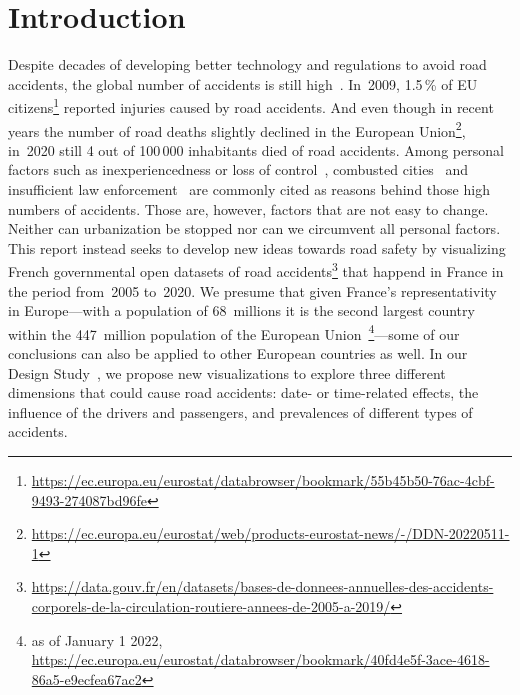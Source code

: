 \section{Introduction}
Despite decades of developing better technology and regulations to avoid road accidents, the global number of accidents is still high~\cite{Who2015}. In~2009, 1.5\,\% of EU citizens\footnote{\url{https://ec.europa.eu/eurostat/databrowser/bookmark/55b45b50-76ac-4cbf-9493-274087bd96fe}} reported injuries caused by road accidents. And even though in recent years the number of road deaths slightly declined in the European Union\footnote{\url{https://ec.europa.eu/eurostat/web/products-eurostat-news/-/DDN-20220511-1}}, in~2020 still 4 out of 100\,000 inhabitants died of road accidents. Among personal factors such as inexperiencedness or loss of control~\cite{RolisonRMF2018}, combusted cities~\cite{AlbalateF2021} and insufficient law enforcement~\cite{Who2015} are commonly cited as reasons behind those high numbers of accidents. Those are, however, factors that are not easy to change. Neither can urbanization be stopped nor can we circumvent all personal factors. This report instead seeks to develop new ideas towards road safety by visualizing French governmental open datasets of road accidents\footnote{\url{https://data.gouv.fr/en/datasets/bases-de-donnees-annuelles-des-accidents-corporels-de-la-circulation-routiere-annees-de-2005-a-2019/}} that happend in France in the period from~2005 to~2020. We presume that given France's representativity in Europe---with a population of 68~millions it is the second largest country within the 447~million population of the European Union~\footnote{as of January 1 2022, \url{https://ec.europa.eu/eurostat/databrowser/bookmark/40fd4e5f-3ace-4618-86a5-e9ecfea67ac2}}---some of our conclusions can also be applied to other European countries as well. In our Design Study~\cite{Munzner2008}, we propose new visualizations to explore three different dimensions that could cause road accidents: \Ni date- or time-related effects, \Nii the influence of the drivers and passengers, and \Niii prevalences of different types of accidents.

